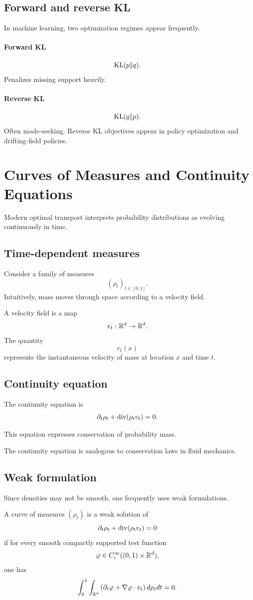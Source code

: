 \subsection{Forward and reverse KL}
In machine learning, two optimization regimes appear frequently.
\paragraph{Forward KL}
\[
\mathrm{KL}(p\|q).
\]
Penalizes missing support heavily.
\paragraph{Reverse KL}
\[
\mathrm{KL}(q\|p).
\]
Often mode-seeking.
Reverse KL objectives appear in policy optimization and drifting-field policies.
\section{Curves of Measures and Continuity Equations}
Modern optimal transport interprets probability distributions as evolving continuously in time.
\subsection{Time-dependent measures}
Consider a family of measures
\[
(\rho_t)_{t\in[0,1]}.
\]
Intuitively, mass moves through space according to a velocity field.
\begin{definition}
A velocity field is a map
\[
v_t : \mathbb{R}^d \to \mathbb{R}^d.
\]
The quantity
\[
v_t(x)
\]
represents the instantaneous velocity of mass at location $x$ and time $t$.
\end{definition}
\subsection{Continuity equation}
\begin{definition}
The continuity equation is
\[
\partial_t \rho_t
+
\operatorname{div}(\rho_t v_t)=0.
\]
\end{definition}
This equation expresses conservation of probability mass.
\begin{remark}
The continuity equation is analogous to conservation laws in fluid mechanics.
\end{remark}
\subsection{Weak formulation}
Since densities may not be smooth, one frequently uses weak formulations.
\begin{definition}
A curve of measures $(\rho_t)$ is a weak solution of
\[
\partial_t \rho_t
+
\operatorname{div}(\rho_t v_t)=0
\]
if for every smooth compactly supported test function
\[
\varphi \in C_c^{\infty}((0,1)\times \mathbb{R}^d),
\]
one has
\[
\int_0^1
\int_{\mathbb{R}^d}
\left(
\partial_t \varphi
+
\nabla \varphi \cdot v_t
\right)
 d\rho_t dt
=
0.
\]
\end{definition}
